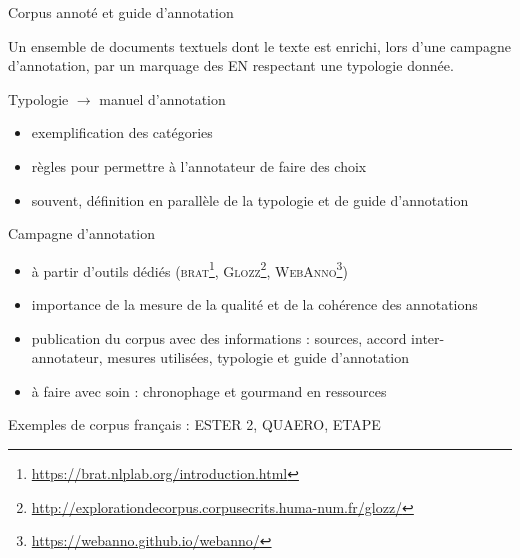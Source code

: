 \documentclass[xetex,xcolor={table,usenames,dvipsnames}]{beamer}
\begin{document}
\begin{frame}{Corpus annoté et guide d'annotation}
	\begin{block}{\vspace{-0.6cm}}
		\justifying
		Un \textcolor{deepred}{ensemble de documents textuels} dont le texte est enrichi, lors d'une \textcolor{deepred}{campagne d'annotation}, par un \textcolor{deepred}{marquage} des \textsc{EN} respectant une \textcolor{deepred}{typologie} donnée.
	\end{block}
	
	Typologie $\rightarrow$ manuel d'annotation
\begin{itemize}
	\item exemplification des catégories
	\item règles pour permettre à l'annotateur de faire des choix
	\item souvent, définition en parallèle de la typologie et de guide d'annotation
\end{itemize}
\end{frame}

\begin{frame}{Campagne d'annotation}
	\begin{itemize}
		\item à partir d'outils dédiés (\textsc{brat}\footnote{\url{https://brat.nlplab.org/introduction.html}}, \textsc{Glozz}\footnote{\url{http://explorationdecorpus.corpusecrits.huma-num.fr/glozz/}}, \textsc{WebAnno}\footnote{\url{https://webanno.github.io/webanno/}})
		\item importance de la mesure de la qualité et de la cohérence des annotations
		\item publication du corpus avec des informations : sources, accord inter-annotateur, mesures utilisées, typologie et guide d'annotation
		\item à faire avec soin : chronophage et gourmand en ressources
	\end{itemize}
	
	Exemples de corpus français : \textsc{ESTER 2}, \textsc{QUAERO}, \textsc{ETAPE}

\end{frame}
\end{document}
